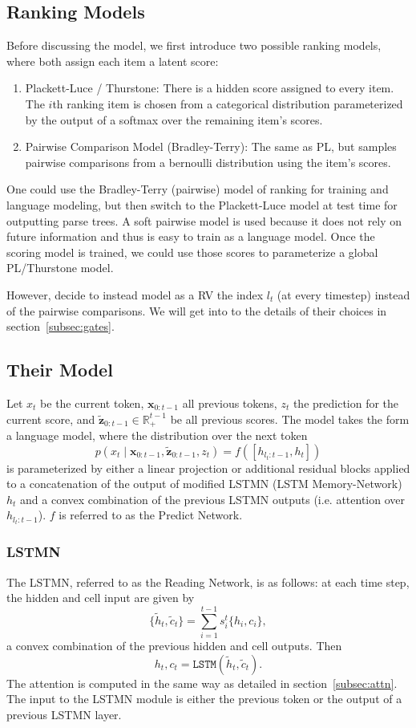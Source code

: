 \documentclass{article}
\newcommand{\bx}{\mathbf{x}}
\newcommand{\bz}{\mathbf{z}}
\newcommand{\R}{\mathbb{R}}
\begin{document}
\subsection{Ranking Models}
Before discussing the \citet{shen2018prpn} model, we first introduce
two possible ranking models, where both assign each item a latent score:
\begin{enumerate}
\item Plackett-Luce / Thurstone:
There is a hidden score assigned to every item.
The $i$th ranking item is chosen from a categorical distribution 
parameterized by the output of a softmax over the remaining item's scores.
\item Pairwise Comparison Model (Bradley-Terry):
The same as PL, but samples pairwise comparisons from a bernoulli distribution
using the item's scores.
\end{enumerate}
One could use the Bradley-Terry (pairwise)
model of ranking for training and language modeling,
but then switch to the Plackett-Luce model at test time for outputting parse trees.
A soft pairwise model is used because it does not rely on future information and thus
is easy to train as a language model.
Once the scoring model is trained, we could use those scores to parameterize a global
PL/Thurstone model.

However, \citet{shen2018prpn} decide to instead
model as a RV the index $l_t$ (at every timestep) instead of the pairwise comparisons.
We will get into to the details of their choices in section~\ref{subsec:gates}.

\subsection{Their Model}
Let $x_t$ be the current token, $\bx_{0:t-1}$ all previous tokens,
$z_t$ the prediction for the current score,
and $\tilde{\bz}_{0:t-1}\in\R^{t-1}_+$ be all previous scores.
The model takes the form a language model,
where the distribution over the next token
$$p(x_t\mid \bx_{0:t-1}, \tilde{\bz}_{0:t-1},z_t) = f([h_{l_t:t-1},h_t])$$
is parameterized by either a linear projection or additional residual blocks
applied to a concatenation of the output of modified LSTMN (LSTM Memory-Network) $h_t$
and a convex combination of the previous LSTMN outputs (i.e. attention over $h_{l_t:t-1}$).
$f$ is referred to as the Predict Network.

\subsubsection{LSTMN}
\label{subsec:lstmn}
The LSTMN, referred to as the Reading Network, is as follows:
at each time step, the hidden and cell input are given by
$$\{\tilde{h}_t,\tilde{c}_t\} = \sum_{i=1}^{t-1} s_i^t\{h_i,c_i\},$$
a convex combination of the previous hidden and cell outputs.
Then $$h_t,c_t = \texttt{LSTM}(\tilde{h}_t,\tilde{c}_t).$$
The attention is computed in the same way as detailed in section~\ref{subsec:attn}.
The input to the LSTMN module is either the previous token or the
output of a previous LSTMN layer.
\end{document}
